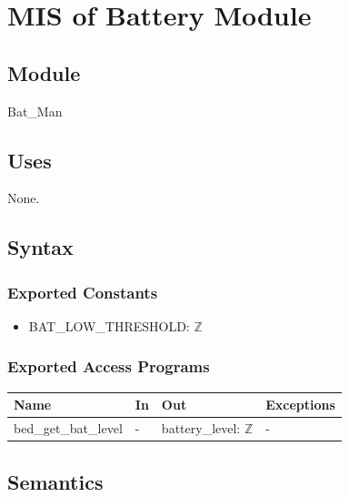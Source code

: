 \documentclass[12pt, titlepage]{article}
\begin{document}






\section{MIS of Battery Module} \label{mBM} 

\subsection{Module}

Bat\_Man

\subsection{Uses}

None.

\subsection{Syntax}

\subsubsection{Exported Constants}
\begin{itemize}
\item BAT\_LOW\_THRESHOLD: $\mathbb{Z}$
\end{itemize}

\subsubsection{Exported Access Programs}

\begin{center}
\begin{tabular}{p{4cm} p{4cm} p{3cm} p{4cm}}
\hline
\textbf{Name} & \textbf{In} & \textbf{Out} & \textbf{Exceptions} \\
\hline
bed\_get\_bat\_level & - & battery\_level: $\mathbb{Z}$ & -\\
\hline
\end{tabular}
\end{center}

\subsection{Semantics}
\end{document}
